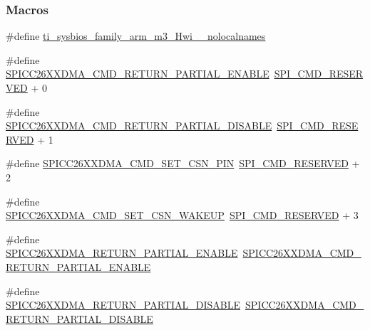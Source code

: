 \subsubsection*{Macros}
\begin{DoxyCompactItemize}
\item 
\#define \hyperlink{_s_p_i_c_c26_x_x_d_m_a_8h_aaa17ecf48f5762e2e1bdb0bab8aacf0c}{ti\+\_\+sysbios\+\_\+family\+\_\+arm\+\_\+m3\+\_\+\+Hwi\+\_\+\+\_\+nolocalnames}
\item 
\#define \hyperlink{_s_p_i_c_c26_x_x_d_m_a_8h_a348d271d5ad295c5e049e78d745c57e1}{S\+P\+I\+C\+C26\+X\+X\+D\+M\+A\+\_\+\+C\+M\+D\+\_\+\+R\+E\+T\+U\+R\+N\+\_\+\+P\+A\+R\+T\+I\+A\+L\+\_\+\+E\+N\+A\+B\+L\+E}~\hyperlink{_s_p_i_8h_a3d23d16525ee76f77276472d8dea80b0}{S\+P\+I\+\_\+\+C\+M\+D\+\_\+\+R\+E\+S\+E\+R\+V\+E\+D} + 0
\item 
\#define \hyperlink{_s_p_i_c_c26_x_x_d_m_a_8h_aff8de4036abcdb2903cb5280120c30b4}{S\+P\+I\+C\+C26\+X\+X\+D\+M\+A\+\_\+\+C\+M\+D\+\_\+\+R\+E\+T\+U\+R\+N\+\_\+\+P\+A\+R\+T\+I\+A\+L\+\_\+\+D\+I\+S\+A\+B\+L\+E}~\hyperlink{_s_p_i_8h_a3d23d16525ee76f77276472d8dea80b0}{S\+P\+I\+\_\+\+C\+M\+D\+\_\+\+R\+E\+S\+E\+R\+V\+E\+D} + 1
\item 
\#define \hyperlink{_s_p_i_c_c26_x_x_d_m_a_8h_ab3ab03abd9ca073344acdcc6b442f9eb}{S\+P\+I\+C\+C26\+X\+X\+D\+M\+A\+\_\+\+C\+M\+D\+\_\+\+S\+E\+T\+\_\+\+C\+S\+N\+\_\+\+P\+I\+N}~\hyperlink{_s_p_i_8h_a3d23d16525ee76f77276472d8dea80b0}{S\+P\+I\+\_\+\+C\+M\+D\+\_\+\+R\+E\+S\+E\+R\+V\+E\+D} + 2
\item 
\#define \hyperlink{_s_p_i_c_c26_x_x_d_m_a_8h_ae07fd93964e63fc93795835eaa14b589}{S\+P\+I\+C\+C26\+X\+X\+D\+M\+A\+\_\+\+C\+M\+D\+\_\+\+S\+E\+T\+\_\+\+C\+S\+N\+\_\+\+W\+A\+K\+E\+U\+P}~\hyperlink{_s_p_i_8h_a3d23d16525ee76f77276472d8dea80b0}{S\+P\+I\+\_\+\+C\+M\+D\+\_\+\+R\+E\+S\+E\+R\+V\+E\+D} + 3
\item 
\#define \hyperlink{_s_p_i_c_c26_x_x_d_m_a_8h_a5d2c909f70c7093227d1b288354cef27}{S\+P\+I\+C\+C26\+X\+X\+D\+M\+A\+\_\+\+R\+E\+T\+U\+R\+N\+\_\+\+P\+A\+R\+T\+I\+A\+L\+\_\+\+E\+N\+A\+B\+L\+E}~\hyperlink{_s_p_i_c_c26_x_x_d_m_a_8h_a348d271d5ad295c5e049e78d745c57e1}{S\+P\+I\+C\+C26\+X\+X\+D\+M\+A\+\_\+\+C\+M\+D\+\_\+\+R\+E\+T\+U\+R\+N\+\_\+\+P\+A\+R\+T\+I\+A\+L\+\_\+\+E\+N\+A\+B\+L\+E}
\item 
\#define \hyperlink{_s_p_i_c_c26_x_x_d_m_a_8h_a6454ac0d2222d98114cf15a4a60367ca}{S\+P\+I\+C\+C26\+X\+X\+D\+M\+A\+\_\+\+R\+E\+T\+U\+R\+N\+\_\+\+P\+A\+R\+T\+I\+A\+L\+\_\+\+D\+I\+S\+A\+B\+L\+E}~\hyperlink{_s_p_i_c_c26_x_x_d_m_a_8h_aff8de4036abcdb2903cb5280120c30b4}{S\+P\+I\+C\+C26\+X\+X\+D\+M\+A\+\_\+\+C\+M\+D\+\_\+\+R\+E\+T\+U\+R\+N\+\_\+\+P\+A\+R\+T\+I\+A\+L\+\_\+\+D\+I\+S\+A\+B\+L\+E}

\end{DoxyCompactItemize}

